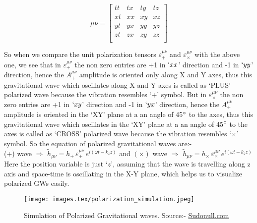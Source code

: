 \begin{equation*}
\mu\nu =
    \begin{bmatrix}
    tt & tx & ty & tz \\
    xt & xx & xy & xz \\
    yt & yx & yy & yz \\
    zt & zx & zy & zz \\
    \end{bmatrix}
\end{equation*}

\noindent So when we compare the unit polarization tensors $\varepsilon^{\mu\nu}_{+}$ and $\varepsilon^{\mu\nu}_{\times}$ with the above one, we see that in $\varepsilon^{\mu\nu}_{+}$ the non zero entries are +1 in $`xx$' direction and -1 in $`yy$' direction, hence the $A^{\mu\nu}_{+}$ amplitude is oriented only along X and Y axes, thus this gravitational wave which oscillates along X and Y axes is called as `PLUS' polarized wave because the vibration resembles `+' symbol. But in $\varepsilon^{\mu\nu}_{\times}$ the non zero entries are +1 in $`xy$' direction and -1 in $`yx$' direction, hence the $A^{\mu\nu}_{+}$ amplitude is oriented in the `XY' plane at a an angle of 45$\degree$ to the axes, thus this gravitational wave which oscillates in the `XY' plane at a an angle of 45$\degree$ to the axes is called as `CROSS' polarized wave because the vibration resembles `$\times$' symbol. So the equation of polarized gravitational waves are:-\\

\hspace{0.7cm} (+) wave $\Rightarrow $  $\tilde{h}_{\mu\nu} = h_{+}\, \varepsilon^{\mu\nu}_{+}\, e^{i(\omega t - k_{z}z)}$ \hspace{2mm} and \hspace{2mm} $(\times)$ wave $\Rightarrow $  $\tilde{h}_{\mu\nu} = h_{\times}\, \varepsilon^{\mu\nu}_{\times}\, e^{i(\omega t - k_{z}z)}$
\\

\noindent Here the position variable is just `$z$', assuming that the wave is travelling along z axis and space-time is oscillating in the X-Y plane, which helps us to visualize polarized GWs easily.

\begin{figure}[h]
    \centering
    \texttt{[image: images.tex/polarization\_simulation.jpeg]}
    \caption{Simulation of Polarized Gravitational waves. Source:- \href{https://sudonull.com/post/7567-Einstein-Telescope-a-new-generation-gravitational-wave-detector}{Sudonull.com}}
\end{figure}

\pagebreak
